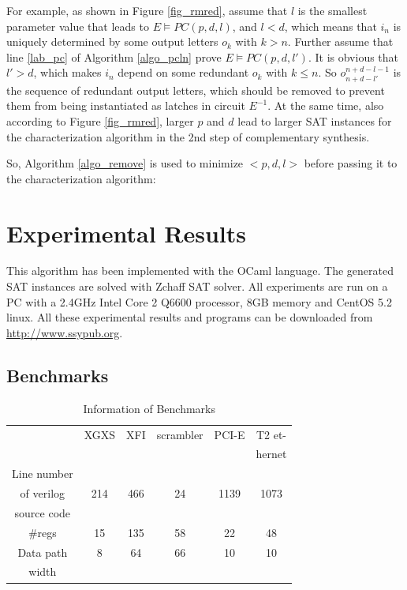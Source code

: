 \documentclass[journal]{IEEEtran}
\begin{document}
For example,
as shown in Figure \ref{fig_rmred},
assume that $l$ is the smallest parameter value that leads to $E\vDash PC(p,d,l)$,
and $l<d$,
which means that $i_n$ is uniquely determined by some output letters $o_k$ with $k>n$.
Further assume that line \ref{lab_pc} of Algorithm \ref{algo_pcln} prove $E\vDash PC(p,d,l')$.
It is obvious that $l'>d$,
which makes $i_n$ depend on some redundant $o_k$ with $k\le n$.
So $o_{n+d-l'}^{n+d-l-1}$ is the sequence of redundant output letters,
which should be removed to prevent them from being instantiated as latches in circuit $E^{-1}$.
At the same time,
also according to Figure \ref{fig_rmred},
larger $p$ and $d$ lead to larger SAT instances for the characterization algorithm in the 2nd step of complementary synthesis.

So,
Algorithm \ref{algo_remove} is used to minimize $<p,d,l>$ before passing it to the characterization algorithm:




\section{Experimental Results}\label{sec_exp}
This algorithm has been implemented with the OCaml language.
The generated SAT instances are solved with Zchaff SAT solver\cite{CHAFF}.
All experiments are run on a PC with a 2.4GHz Intel Core 2 Q6600 processor, 8GB memory and CentOS 5.2 linux.
All these experimental results and programs can be downloaded from \url{http://www.ssypub.org}.
\subsection{Benchmarks}
\begin{table}[t]
\centering
\caption{Information of Benchmarks}
\begin{tabular}{|c|c|c|c|c|c|}
\hline
&XGXS&XFI&scrambler&PCI-E&T2 et-\\
&&&&&hernet\\\hline
Line number&&&&&\\
of verilog&214&466&24&1139&1073\\
source code&&&&&\\\hline
\#regs&15&135&58&22&48\\\hline
Data path&8&64&66&10&10\\
width&&&&&\\ \hline
\end{tabular}\label{tab_info}
\end{table}
\end{document}
